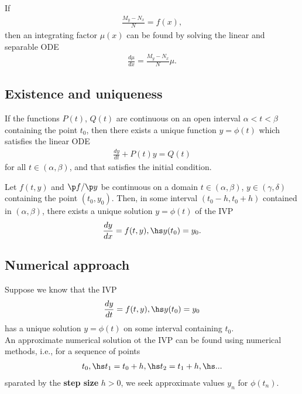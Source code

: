 \documentclass{article}
\begin{document}
\begin{theorem}
    If
    \begin{align*}
        \frac{M_y-N_x}{N}=f(x),
    \end{align*}
    then an integrating factor $\mu(x)$
    can be found by solving the linear and separable ODE
    \begin{align*}
        \frac{d\mu}{dx}=\frac{M_y-N_x}{N}\mu.
    \end{align*}
\end{theorem}


\subsection{Existence and uniqueness}


\begin{theorem}
    If the functions $P(t)$, $Q(t)$ are continuous on an open interval
    $\alpha<t<\beta$ containing the point $t_0$, then there exists a
    unique function $y=\phi(t)$ which satisfies the linear ODE
    \begin{align*}
        \frac{dy}{dt}+P(t)y=Q(t)
    \end{align*}
    for all $t\in(\alpha,\beta)$, and that satisfies the initial condition.
\end{theorem}

\begin{theorem}
    Let $f(t,y)$ and $\p f/\p y$ be continuous on a domain $t\in(\alpha,\beta)$,
    $y\in(\gamma,\delta)$ containing the point $(t_0, y_0)$. Then, in some
    interval $(t_0-h, t_0+h)$ contained in $(\alpha, \beta)$, there exists
    a unique solution $y=\phi(t)$ of the IVP
    \begin{align*}
        \frac{dy}{dx}=f(t,y),\hs y(t_0) = y_0.
    \end{align*}
\end{theorem}


\subsection{Numerical approach}


\begin{theorem}
    Suppose we know that the IVP
    \begin{align*}
        \frac{dy}{dt} = f(t,y),\hs y(t_0) = y_0
    \end{align*}
    has a unique solution $y=\phi(t)$ on some interval containing $t_0$.\\
    An approximate numerical solution ot the IVP can be found using
    numerical methods, i.e., for a sequence of points
    \begin{align*}
        t_0,\hs t_1=t_0+h,\hs t_2=t_1+h,\hs...
    \end{align*}
    sparated by the \textbf{step size} $h>0$, we seek approximate values
    $y_n$ for $\phi(t_n)$.
\end{theorem}
\end{document}
